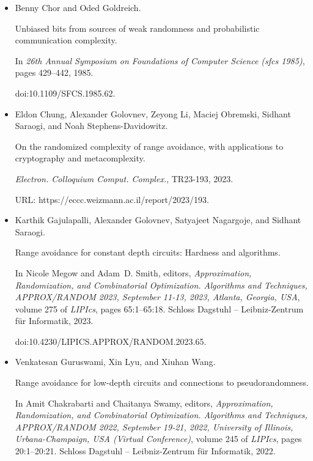 \begin{itemize}
doi:10.1145/3618260.3649602.





\item[] 
[9]

Benny Chor and Oded Goldreich.


Unbiased bits from sources of weak randomness and probabilistic
communication complexity.


In \emph{26th Annual Symposium on Foundations of Computer Science
(sfcs 1985)}, pages 429–442, 1985.


doi:10.1109/SFCS.1985.62.





\item[] 
[10]

Eldon Chung, Alexander Golovnev, Zeyong Li, Maciej Obremski, Sidhant Saraogi,
and Noah Stephens-Davidowitz.


On the randomized complexity of range avoidance, with applications to
cryptography and metacomplexity.


\emph{Electron. Colloquium Comput. Complex.}, TR23-193, 2023.


URL: https://eccc.weizmann.ac.il/report/2023/193.





\item[] 
[11]

Karthik Gajulapalli, Alexander Golovnev, Satyajeet Nagargoje, and Sidhant
Saraogi.


Range avoidance for constant depth circuits: Hardness and algorithms.


In Nicole Megow and Adam D. Smith, editors, \emph{Approximation,
Randomization, and Combinatorial Optimization. Algorithms and Techniques,
APPROX/RANDOM 2023, September 11-13, 2023, Atlanta, Georgia, USA}, volume
275 of \emph{LIPIcs}, pages 65:1–65:18. Schloss Dagstuhl – Leibniz-Zentrum
für Informatik, 2023.


doi:10.4230/LIPICS.APPROX/RANDOM.2023.65.





\item[] 
[12]

Venkatesan Guruswami, Xin Lyu, and Xiuhan Wang.


Range avoidance for low-depth circuits and connections to
pseudorandomness.


In Amit Chakrabarti and Chaitanya Swamy, editors, \emph{Approximation,
Randomization, and Combinatorial Optimization. Algorithms and Techniques,
APPROX/RANDOM 2022, September 19-21, 2022, University of Illinois,
Urbana-Champaign, USA (Virtual Conference)}, volume 245 of \emph{LIPIcs},
pages 20:1–20:21. Schloss Dagstuhl – Leibniz-Zentrum für Informatik,
2022.



\end{itemize}
